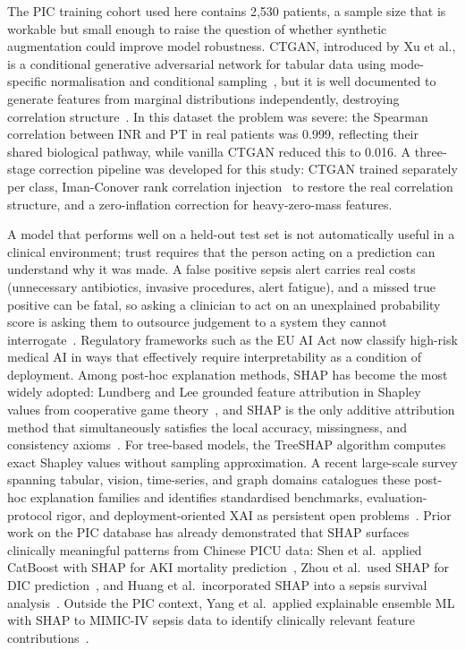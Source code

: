 \documentclass[final,3p,times]{elsarticle}
\begin{document}
The PIC training cohort used here contains 2,530 patients, a
sample size that is workable but small enough to raise the
question of whether synthetic augmentation could improve model
robustness. CTGAN, introduced by Xu et al., is a conditional
generative adversarial network for tabular data using
mode-specific normalisation and conditional sampling~\cite{xu2019},
but it is well documented to generate features from marginal
distributions independently, destroying correlation
structure~\cite{xu2019}. In this dataset the problem was severe:
the Spearman correlation between INR and PT in real patients was
0.999, reflecting their shared biological pathway, while vanilla
CTGAN reduced this to 0.016. A three-stage correction pipeline was
developed for this study: CTGAN trained separately per class,
Iman-Conover rank correlation injection~\cite{iman1982} to restore
the real correlation structure, and a zero-inflation correction for
heavy-zero-mass features.

A model that performs well on a held-out test set is not
automatically useful in a clinical environment; trust requires
that the person acting on a prediction can understand why it was
made. A false positive sepsis alert carries real costs
(unnecessary antibiotics, invasive procedures, alert fatigue), and
a missed true positive can be fatal, so asking a clinician to act
on an unexplained probability score is asking them to outsource
judgement to a system they cannot interrogate~\cite{athukorala2026}.
Regulatory frameworks such as the EU AI Act now classify high-risk
medical AI in ways that effectively require interpretability as a
condition of deployment. Among post-hoc explanation methods, SHAP
has become the most widely adopted: Lundberg and Lee grounded
feature attribution in Shapley values from cooperative game
theory~\cite{lundberg2017}, and SHAP is the only additive
attribution method that simultaneously satisfies the local
accuracy, missingness, and consistency axioms~\cite{lundberg2017}.
For tree-based models, the TreeSHAP algorithm computes exact
Shapley values without sampling approximation. A recent large-scale
survey spanning tabular, vision, time-series, and graph domains
catalogues these post-hoc explanation families and identifies
standardised benchmarks, evaluation-protocol rigor, and
deployment-oriented XAI as persistent open
problems~\cite{khan2026}. Prior work on the
PIC database has already demonstrated that SHAP surfaces clinically
meaningful patterns from Chinese PICU data: Shen et al.\ applied
CatBoost with SHAP for AKI mortality prediction~\cite{shen2025},
Zhou et al.\ used SHAP for DIC prediction~\cite{zhou2025}, and
Huang et al.\ incorporated SHAP into a sepsis survival
analysis~\cite{huang2025}. Outside the PIC context, Yang et al.\
applied explainable ensemble ML with SHAP to MIMIC-IV sepsis data
to identify clinically relevant feature contributions~\cite{jiang2023}.
\end{document}
